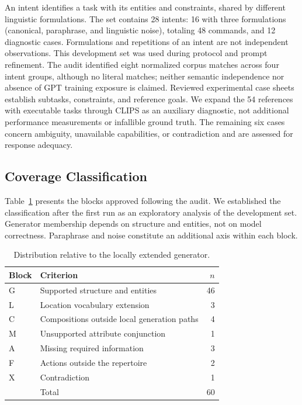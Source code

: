 \documentclass[a4paper,twoside]{article}
\begin{document}
An intent identifies a task with its entities and constraints, shared by different linguistic formulations. The set contains 28 intents: 16 with three formulations (canonical, paraphrase, and linguistic noise), totaling 48 commands, and 12 diagnostic cases. Formulations and repetitions of an intent are not independent observations. This development set was used during protocol and prompt refinement. The audit identified eight normalized corpus matches across four intent groups, although no literal matches; neither semantic independence nor absence of GPT training exposure is claimed. Reviewed experimental case sheets establish subtasks, constraints, and reference goals. We expand the 54 references with executable tasks through CLIPS as an auxiliary diagnostic, not additional performance measurements or infallible ground truth. The remaining six cases concern ambiguity, unavailable capabilities, or contradiction and are assessed for response adequacy.

\subsection{Coverage Classification}

Table~\ref{tab:bloques_piloto} presents the blocks approved following the audit. We established the classification after the first run as an exploratory analysis of the development set. Generator membership depends on structure and entities, not on model correctness. Paraphrase and noise constitute an additional axis within each block.

\begin{table}[htbp]
\centering\small
\caption{Distribution relative to the locally extended generator.}
\label{tab:bloques_piloto}
\begin{tabularx}{\columnwidth}{@{}l>{\raggedright\arraybackslash}Xr@{}}
\toprule
Block & Criterion & $n$ \\
\midrule
G & Supported structure and entities & 46 \\
L & Location vocabulary extension & 3 \\
C & Compositions outside local generation paths & 4 \\
M & Unsupported attribute conjunction & 1 \\
A & Missing required information & 3 \\
F & Actions outside the repertoire & 2 \\
X & Contradiction & 1 \\
\midrule
 & Total & 60 \\
\bottomrule
\end{tabularx}
\end{table}
\end{document}
